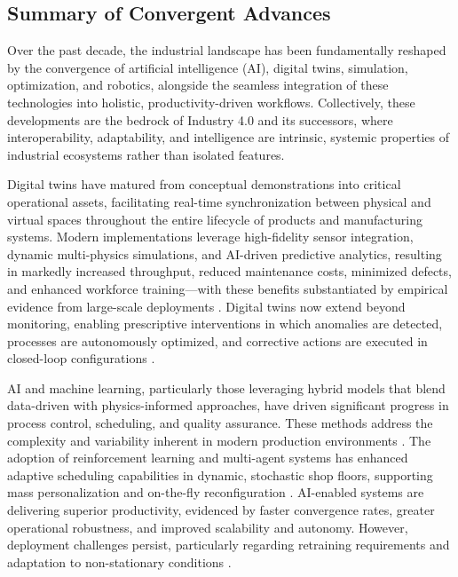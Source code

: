 \documentclass[sigconf]{acmart}
\begin{document}
\subsection{Summary of Convergent Advances}

Over the past decade, the industrial landscape has been fundamentally reshaped by the convergence of artificial intelligence (AI), digital twins, simulation, optimization, and robotics, alongside the seamless integration of these technologies into holistic, productivity-driven workflows. Collectively, these developments are the bedrock of Industry 4.0 and its successors, where interoperability, adaptability, and intelligence are intrinsic, systemic properties of industrial ecosystems rather than isolated features.

Digital twins have matured from conceptual demonstrations into critical operational assets, facilitating real-time synchronization between physical and virtual spaces throughout the entire lifecycle of products and manufacturing systems. Modern implementations leverage high-fidelity sensor integration, dynamic multi-physics simulations, and AI-driven predictive analytics, resulting in markedly increased throughput, reduced maintenance costs, minimized defects, and enhanced workforce training—with these benefits substantiated by empirical evidence from large-scale deployments \cite{ref38}. Digital twins now extend beyond monitoring, enabling prescriptive interventions in which anomalies are detected, processes are autonomously optimized, and corrective actions are executed in closed-loop configurations \cite{ref41}\cite{ref43}.

AI and machine learning, particularly those leveraging hybrid models that blend data-driven with physics-informed approaches, have driven significant progress in process control, scheduling, and quality assurance. These methods address the complexity and variability inherent in modern production environments \cite{ref18}\cite{ref39}\cite{ref61}. The adoption of reinforcement learning and multi-agent systems has enhanced adaptive scheduling capabilities in dynamic, stochastic shop floors, supporting mass personalization and on-the-fly reconfiguration \cite{ref19}\cite{ref24}\cite{ref55}. AI-enabled systems are delivering superior productivity, evidenced by faster convergence rates, greater operational robustness, and improved scalability and autonomy. However, deployment challenges persist, particularly regarding retraining requirements and adaptation to non-stationary conditions \cite{ref24}\cite{ref55}.
\end{document}
